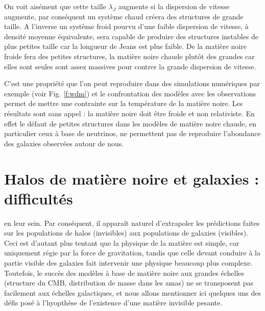 On voit aisément que cette taille $\lambda_J$ augmente si la dispersion de vitesse augmente, par conséquent un système chaud créera des structures de grande taille. A l'inverse un système froid pourvu d'une faible dispersion de vitesse, à densité moyenne équivalente, sera capable de produire des structures instables de plus petites taille car la longueur de Jeans est plus faible. De la matière noire froide fera des petites structures, la matière noire  chaude plutôt des grandes car elles sont seules sont assez massives pour contrer la grande dispersion de vitesse. 

C'est une propriété que l'on peut reproduire dans des simulations numériques par exemple (voir Fig. \ref{f:wdm}) et le confrontation des modèles avec les observations permet de mettre une contrainte sur la température de la matière noire. Les résultats sont sans appel : la matière noire doit être froide et non relativiste. En effet le défaut de petites structures dans les modèles de matière noire chaude, en particulier ceux à base de neutrinos, ne permettent pas de reproduire l'abondance des galaxies observées autour de nous.

\section{Halos de matière noire et galaxies : difficultés}
 en leur sein. Par conséquent, il apparaît naturel d'extrapoler les prédictions faites sur les populations de halos (invisibles) aux populations de galaxies (visibles). Ceci est d'autant plus tentant que la physique de la matière est simple, car uniquement régie par la force de gravitation, tandis que celle devant conduire à la partie visible des galaxies fait intervenir une physique beaucoup plus complexe. Toutefois, le succès des modèles à base de matière noire aux grandes échelles (structure du CMB, distribution de masse dans les amas) ne se transposent pas facilement aux échelles galactiques, et nous allons mentionner ici quelques uns des défis posé à l'hyopthèse de l'existence d'une matière invisible pesante.

